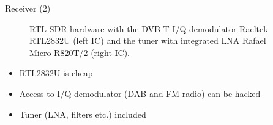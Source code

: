 \documentclass[apectratio=169]{beamer}
\begin{document}
\begin{frame}{Receiver (2)}

\begin{minipage}{0.45\textwidth}
	\begin{figure}[H]	
		\centering
		\caption{RTL-SDR hardware with the DVB-T I/Q demodulator
		Raeltek RTL2832U (left IC) and the tuner with integrated LNA
		Rafael Micro R820T/2 (right IC).}
	\end{figure}
\end{minipage}
\hfill
\begin{minipage}{0.45\textwidth}
	\begin{itemize}
		\item<2-> RTL2832U is cheap  
		\item<3-> Access to I/Q demodulator (DAB and FM radio) can be hacked		\item<4-> Tuner (LNA, filters etc.) included
	\end{itemize}
\end{minipage}
\end{frame}
\end{document}
